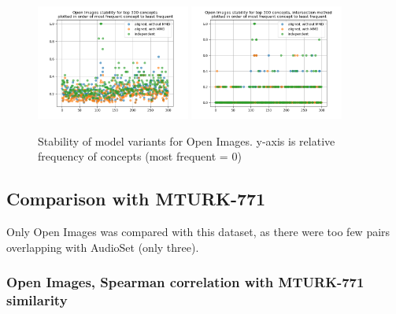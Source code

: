 \begin{figure}[H]
    \centering
    \includegraphics[width=0.45\textwidth]{images/results/openimages_stability.png}
    \includegraphics[width=0.45\textwidth]{images/results/openimages_stability_ixn.png}
    \caption{
        Stability of model variants for Open Images. y-axis is relative frequency of concepts (most frequent = 0)
    }
\end{figure}

\subsection{Comparison with MTURK-771}


Only Open Images was compared with this dataset, as there were too few pairs overlapping with AudioSet (only three). 

\subsubsection{Open Images, Spearman correlation with MTURK-771 similarity}\\

